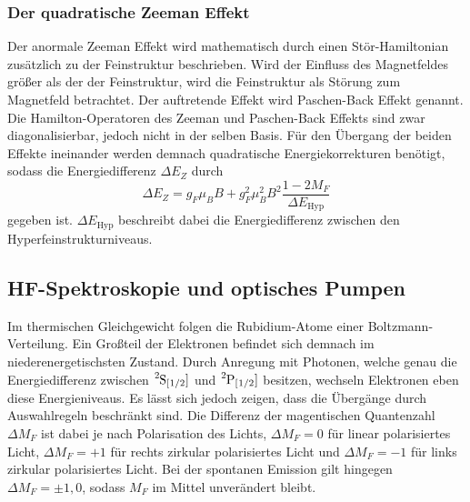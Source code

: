 \subsubsection{Der quadratische Zeeman Effekt}
Der anormale Zeeman Effekt wird mathematisch durch einen Stör-Hamiltonian
zusätzlich zu der Feinstruktur beschrieben. Wird der Einfluss des 
Magnetfeldes größer als der der Feinstruktur, wird die Feinstruktur
als Störung zum Magnetfeld betrachtet. Der auftretende Effekt wird 
Paschen-Back Effekt genannt. Die Hamilton-Operatoren des Zeeman und 
Paschen-Back Effekts sind zwar diagonalisierbar, jedoch nicht in der 
selben Basis. Für den Übergang der beiden Effekte ineinander werden 
demnach quadratische Energiekorrekturen benötigt, sodass die 
Energiedifferenz $\Delta E_Z$ durch 
\begin{equation}
    \Delta E_Z=g_F\mu_BB+g_F^2\mu_B^2B^2\frac{1-2M_F}{\Delta E_\text{Hyp}}
\end{equation}
gegeben ist. $\Delta E_\text{Hyp}$ beschreibt dabei die Energiedifferenz
zwischen den Hyperfeinstrukturniveaus.

\subsection{HF-Spektroskopie und optisches Pumpen}
Im thermischen Gleichgewicht folgen die Rubidium-Atome einer 
Boltzmann-Verteilung. Ein Großteil der Elektronen befindet sich 
demnach im niederenergetischsten Zustand. Durch Anregung mit Photonen,
welche genau die Energiedifferenz zwischen $\ce{^{2}S_[1/2]}$ und 
$\ce{^{2}P_[1/2]}$ besitzen, wechseln Elektronen eben diese Energieniveaus.
Es lässt sich jedoch zeigen, dass die Übergänge durch Auswahlregeln 
beschränkt sind. Die Differenz der magentischen Quantenzahl $\Delta M_F$
ist dabei je nach Polarisation des Lichts, $\Delta M_F=0$ für 
linear polarisiertes Licht, $\Delta M_F=+1$ für rechts zirkular
polarisiertes Licht und $\Delta M_F=-1$ für links zirkular polarisiertes
Licht. Bei der spontanen Emission gilt hingegen $\Delta M_F =\pm 1,0$, 
sodass $M_F$ im Mittel unverändert bleibt. 

